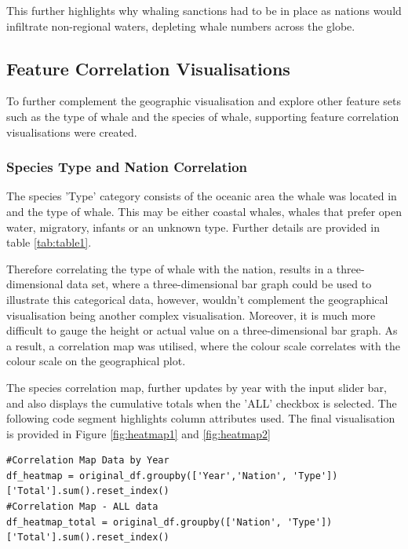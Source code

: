 \documentclass[12pt,a4paper]{article}
\begin{document}
 This further highlights why whaling sanctions had to be in place as nations would infiltrate non-regional waters, depleting whale numbers across the globe.  


\subsection{Feature Correlation Visualisations}
To further complement the geographic visualisation and explore other feature sets such as the type of whale and the species of whale, supporting feature correlation visualisations were created. 

\subsubsection{Species Type and Nation Correlation}

The species 'Type' category consists of the oceanic area the whale was located in and the type of whale. This may be either coastal whales, whales that prefer open water, migratory, infants or an unknown type. Further details are provided in table \ref{tab:table1}. 

Therefore correlating the type of whale with the nation, results in a three-dimensional data set, where a three-dimensional bar graph could be used to illustrate this categorical data, however, wouldn't complement the geographical visualisation being another complex visualisation. Moreover, it is much more difficult to gauge the height or actual value on a three-dimensional bar graph. As a result, a correlation map was utilised, where the colour scale correlates with the colour scale on the geographical plot. 

The species correlation map, further updates by year with the input slider bar, and also displays the cumulative totals when the 'ALL' checkbox is selected. The following code segment highlights column attributes used. The final visualisation is provided in Figure \ref{fig:heatmap1} and \ref{fig:heatmap2}

\begin{verbatim}
#Correlation Map Data by Year
df_heatmap = original_df.groupby(['Year','Nation', 'Type']) 
['Total'].sum().reset_index()
#Correlation Map - ALL data
df_heatmap_total = original_df.groupby(['Nation', 'Type'])
['Total'].sum().reset_index()
\end{verbatim}
\end{document}
